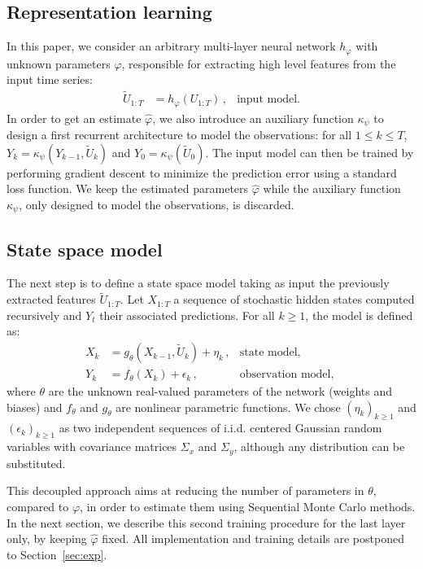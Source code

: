 \documentclass[journal]{IEEEtran}
\begin{document}
\subsection{Representation learning}%
In this paper, we consider an arbitrary multi-layer neural network $h_\varphi$ with unknown parameters $\varphi$, responsible for extracting high level features from the input time series:
\begin{align*}
	\widetilde U_{1:T} & = h_\varphi(U_{1:T})\,, & \text{input model.}
\end{align*}
In order to get an estimate $\hat \varphi$, we also introduce an auxiliary function $\kappa_\psi$ to design a first recurrent architecture to model the observations: for all $1 \leq k \leq T$, $Y_k = \kappa_\psi(Y_{k-1}, \widetilde U_k)$ and $Y_0 = \kappa_\psi(\widetilde U_0)$.
The input model can then be trained by performing gradient descent to minimize the prediction error using a standard loss function.
We keep the estimated parameters $\hat \varphi$ while the auxiliary function $\kappa_\psi$, only designed to model the observations, is discarded.

\subsection{State space model}
\label{sub:proposed_architecture}
The next step is to define  a state space model taking as input the previously extracted features $\widetilde U_{1:T}$.
Let $X_{1:T}$ a sequence of stochastic hidden states computed recursively and $Y_t$ their associated predictions.
For all $k \geq 1$, the model is defined as:
\begin{align*}
	X_k & = g_\theta(X_{k-1}, \widetilde U_k) + \eta_k\,, & \text{state model, }       \\
	Y_k & = f_\theta(X_k) + \epsilon_k\,,                 & \text{observation model, }
\end{align*}
where $\theta$ are the unknown real-valued parameters of the network (weights and biases) and $f_\theta$ and $g_\theta$ are nonlinear parametric functions.
We chose $(\eta_k)_{k\geq 1}$ and $(\epsilon_k)_{k\geq 1}$ as two independent sequences of i.i.d. centered Gaussian random variables with covariance matrices $\Sigma_x$ and $\Sigma_y$, although any distribution can be substituted.

This decoupled approach aims at reducing the number of parameters in $\theta$, compared to $\varphi$, in order to estimate them using Sequential Monte Carlo methods.
In the next section, we describe this second training procedure for the last layer only, by keeping $\hat \varphi$ fixed.
All implementation and training details are postponed to Section~\ref{sec:exp}.
\end{document}
